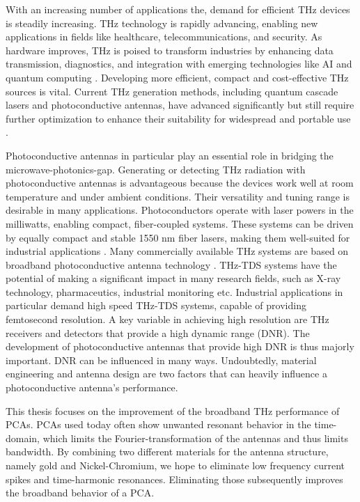 With an increasing number of applications the, demand for efficient THz devices is steadily increasing. THz technology is rapidly advancing, enabling new applications in fields like healthcare, telecommunications, and security. As hardware improves, THz is poised to transform industries by enhancing data transmission, diagnostics, and integration with emerging technologies like AI and quantum computing \cite{shekariApplicationsTerahertzTechnology2025}. Developing more efficient, compact and cost-effective THz sources is vital. Current THz generation methods, including quantum cascade lasers and photoconductive antennas, have advanced significantly but still require further optimization to enhance their suitability for widespread and portable use \cite{THzSecurityApplications}. 

Photoconductive antennas in particular play an essential role in bridging the microwave-photonics-gap. Generating or detecting THz radiation with photoconductive antennas is advantageous because the devices work well at room temperature and under ambient conditions. Their versatility and tuning range is desirable in many applications. Photoconductors operate with laser powers in the milliwatts, enabling compact, fiber-coupled systems. These systems can be driven by equally compact and stable \num{1550} \si{\nano \meter} fiber lasers, making them well-suited for industrial applications \cite{naftalyIndustrialApplicationsTerahertz2019}. Many commercially available THz systems are based on broadband photoconductive antenna technology \cite{burfordReviewTerahertzPhotoconductive2017}. THz-TDS systems have the potential of making a significant impact in many research fields, such as X-ray technology, pharmaceutics, industrial monitoring etc. Industrial applications in particular demand high speed THz-TDS systems, capable of providing femtosecond resolution. A key variable in achieving high resolution are THz receivers and detectors that provide a high dynamic range (DNR). The development of photoconductive antennas that provide high DNR is thus majorly important. DNR can be influenced in many ways. Undoubtedly, material engineering and antenna design are two factors that can heavily influence a photoconductive antenna's performance.  

This thesis focuses on the improvement of the broadband THz performance of PCAs. PCAs used today often show unwanted resonant behavior in the time-domain, which limits the Fourier-transformation of the antennas and thus limits bandwidth. By combining two different materials for the antenna structure, namely gold and Nickel-Chromium, we hope to eliminate low frequency current spikes and time-harmonic resonances. Eliminating those subsequently improves the broadband behavior of a PCA. 